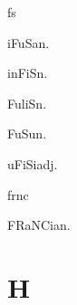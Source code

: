\begin{multicols*}{2}
\begin{dictroot}{f}{s}
\begin{dictentry}{iFuSa}{n.}
{        }
    \end{dictentry}
    \begin{dictentry}{inFiS}{n.}
    \end{dictentry}
    \begin{dictentry}{FuliS}{n.}
    \end{dictentry}
    \begin{dictentry}{FuSu}{n.}
    \end{dictentry}
    \begin{dictentry}{uFiSi}{adj.}
    \end{dictentry}
\end{dictroot}

\begin{dictroot}{fr}{nc}
    \begin{dictentry}{FRaNCia}{n.}
    \end{dictentry}
\end{dictroot}

\section*{H}


\end{multicols*}
